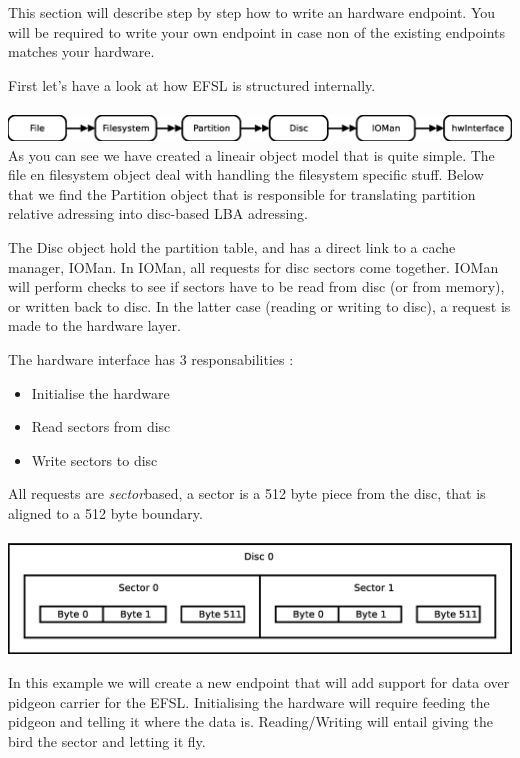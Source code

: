 This section will describe step by step how to write an hardware endpoint.
You will be required to write your own endpoint in case non of the existing endpoints
matches your hardware.

First let's have a look at how EFSL is structured internally.\\\\
\includegraphics[scale=0.4]{schematics/objectmodel.eps}\\

As you can see we have created a lineair object model that is quite simple.
The file en filesystem object deal with handling the filesystem specific stuff.
Below that we find the Partition object that is responsible for translating partition
relative adressing into disc-based LBA adressing.

The Disc object hold the partition table, and has a direct link to a cache manager, IOMan.
In IOMan, all requests for disc sectors come together. IOMan will perform checks to see
if sectors have to be read from disc (or from memory), or written back to disc.
In the latter case (reading or writing to disc), a request is made to the hardware layer.

The hardware interface has 3 responsabilities :
\begin{itemize}
	\item Initialise the hardware
	\item Read sectors from disc
	\item Write sectors to disc
\end{itemize}

All requests are \textsl{sector}based, a sector is a 512 byte piece from the disc, that is aligned to
a 512 byte boundary.\\\\
\includegraphics[scale=0.4]{schematics/sector.eps}

In this example we will create a new endpoint that will add support for data over pidgeon carrier
for the EFSL. Initialising the hardware will require feeding the pidgeon and telling it where the
data is. Reading/Writing will entail giving the bird the sector and letting it fly.

